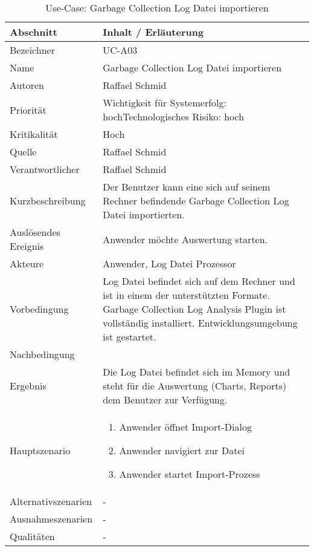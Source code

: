 \begin{longtable}{|p{4cm}|p{10.5cm}|}
\caption{Use-Case: Garbage Collection Log Datei importieren}\\\hline
   \textbf{Abschnitt} & \textbf{Inhalt / Erläuterung} \\\hline
   Bezeichner & UC-A03\\\hline
   Name & Garbage Collection Log Datei importieren\\\hline
   Autoren & Raffael Schmid\\\hline
   Priorität & Wichtigkeit für Systemerfolg: hoch\newline Technologisches Risiko: hoch\\\hline
   Kritikalität & Hoch\\\hline
   Quelle & Raffael Schmid\\\hline
   Verantwortlicher & Raffael Schmid\\\hline
   Kurzbeschreibung & Der Benutzer kann eine sich auf seinem Rechner befindende Garbage Collection Log Datei importierten.\\\hline
   Auslösendes Ereignis & Anwender möchte Auswertung starten.\\\hline
   Akteure & Anwender, Log Datei Prozessor\\\hline
   Vorbedingung & Log Datei befindet sich auf dem Rechner und ist in einem der unterstützten Formate. Garbage Collection Log Analysis Plugin ist vollständig installiert. Entwicklungsumgebung ist gestartet.\\\hline
   Nachbedingung & \\\hline
   Ergebnis & Die Log Datei befindet sich im Memory und steht für die Auswertung (Charts, Reports) dem Benutzer zur Verfügung.\\\hline
   Hauptszenario & 
	\begin{enumerate}
		\item Anwender öffnet Import-Dialog
		\item Anwender navigiert zur Datei
		\item Anwender startet Import-Prozess
	\end{enumerate}
	\\\hline
   Alternativszenarien & -\\\hline
   Ausnahmeszenarien & -\\\hline
   Qualitäten & -\\\hline
\end{longtable}

